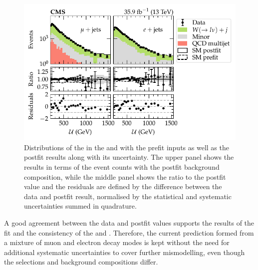 %
\begin{figure}[htb]
    \centering
    \includegraphics{chapters/042_backgrounds/images/postfit_tfmu2ewj.pdf}
    \caption[Recoil distributions in the muon and electron control regions after applying the transfer factors]{
        Distributions of the \recoil in the \muplusjets and \eleplusjets with the prefit inputs as well as the postfit results along with its uncertainty. The upper panel shows the results in terms of the event counts with the postfit background composition, while the middle panel shows the ratio to the postfit value and the residuals are defined by the difference between the data and postfit result, normalised by the statistical and systematic uncertainties summed in quadrature.
    }
    \label{fig:fit_tf_mu_e_wj_postfit}
\end{figure}
%
A good agreement between the data and postfit values supports the results of the fit and the consistency of the \muplusjets and \eleplusjets. Therefore, the current \IWj prediction formed from a mixture of muon and electron decay modes is kept without the need for additional systematic uncertainties to cover further mismodelling, even though the selections and background compositions differ.

